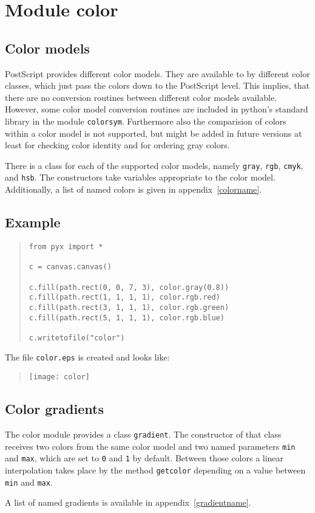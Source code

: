 \chapter{Module color}
\label{color}
\section{Color models}
PostScript provides different color models. They are available to
\PyX{} by different color classes, which just pass the colors down to
the PostScript level. This implies, that there are no conversion
routines between different color models available. However, some color
model conversion routines are included in python's standard library in
the module \texttt{colorsym}. Furthermore also the comparision of
colors within a color model is not supported, but might be added in
future versions at least for checking color identity and for ordering
gray colors.

There is a class for each of the supported color models, namely
\verb|gray|, \verb|rgb|, \verb|cmyk|, and \verb|hsb|. The constructors
take variables appropriate to the color model. Additionally, a list of
named colors is given in appendix~\ref{colorname}.

\section{Example}
\begin{quote}
\begin{verbatim}
from pyx import *

c = canvas.canvas()

c.fill(path.rect(0, 0, 7, 3), color.gray(0.8))
c.fill(path.rect(1, 1, 1, 1), color.rgb.red)
c.fill(path.rect(3, 1, 1, 1), color.rgb.green)
c.fill(path.rect(5, 1, 1, 1), color.rgb.blue)

c.writetofile("color")
\end{verbatim}
\end{quote}

The file \verb|color.eps| is created and looks like:
\begin{quote}
\texttt{[image: color]}
\end{quote}

\section{Color gradients}

The color module provides a class \verb|gradient|. The constructor of
that class receives two colors from the same color model and two
named parameters \verb|min| and \verb|max|, which are set to \verb|0|
and \verb|1| by default. Between those colors a linear interpolation
takes place by the method \verb|getcolor| depending on a value between
\verb|min| and \verb|max|.

A list of named gradients is available in appendix~\ref{gradientname}.

